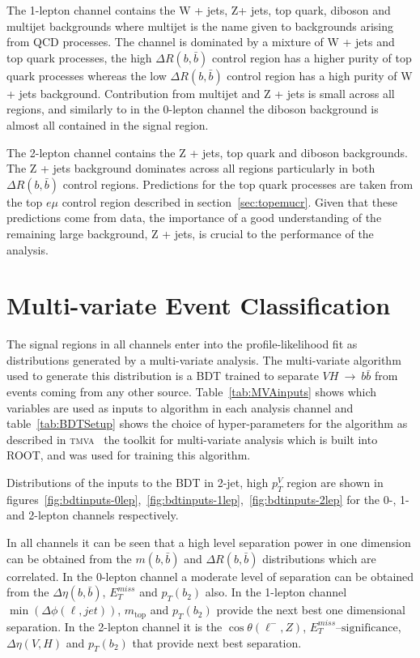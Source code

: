 

The 1-lepton channel contains the W + jets, Z+ jets, top quark, diboson and multijet
backgrounds where multijet is the name given to backgrounds arising from QCD
processes. The channel is dominated by a mixture of W + jets and top quark
processes, the high $\Delta R(b, \bar{b})$ control region has a higher purity of
top quark processes whereas the low $\Delta R(b, \bar{b})$ control region has a
high purity of W + jets background. Contribution from multijet and Z + jets is
small across all regions, and similarly to in the 0-lepton channel the diboson
background is almost all contained in the signal region.

The 2-lepton channel contains the Z + jets, top quark and diboson backgrounds.
The Z + jets background dominates across all regions particularly in both
$\Delta R(b, \bar{b})$ control regions. Predictions for the top quark processes
are taken from the top $e \mu$ control region described in
section~\ref{sec:topemucr}. Given that these predictions come from data, the
importance of a good understanding of the remaining large background, Z + jets,
is crucial to the performance of the analysis.

\section{Multi-variate Event Classification}%
\label{sec:mva}

The signal regions in all channels enter into the profile-likelihood fit as
distributions generated by a multi-variate analysis. The multi-variate algorithm
used to generate this distribution is a BDT trained to separate
$VH~\rightarrow~b\bar{b}$ from events coming from any other source.
Table~\ref{tab:MVAinputs} shows which variables are used as inputs to algorithm
in each analysis channel and table~\ref{tab:BDTSetup} shows the choice of
hyper-parameters for the algorithm as described in \textsc{tmva}~\cite{TMVA} the
toolkit for multi-variate analysis which is built into ROOT, and was used for
training this algorithm. 


Distributions of the inputs to the BDT in 2-jet, high $p_T^V$ region
are shown in
figures~\ref{fig:bdtinputs-0lep},~\ref{fig:bdtinputs-1lep},~\ref{fig:bdtinputs-2lep}
for the 0-, 1- and 2-lepton channels respectively.

In all channels it can be seen that a high level separation power in one
dimension can be obtained from the $m(b,\bar{b})$ and $\Delta R (b, \bar{b})$
distributions which are correlated. In the 0-lepton channel a moderate level of
separation can be obtained from the $\Delta \eta(b, \bar{b})$, $E_T^{miss}$ and
$p_T(b_2)$ also. In the 1-lepton channel $\min(\Delta\phi(\ell,jet))$,
$m_{\text{top}}$ and $p_T(b_2)$ provide the next best one dimensional
separation. In the 2-lepton channel it is the $\cos{\theta(\ell^-,Z)}$,
$E_T^{miss}\text{--significance}$, $\Delta \eta(V, H)$ and $p_T(b_2)$ that
provide next best separation.
  
